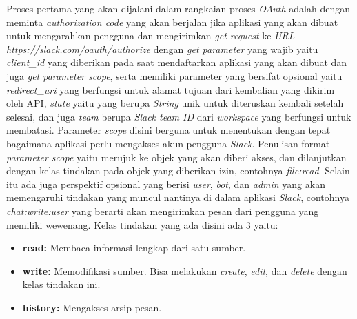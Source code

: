 Proses pertama yang akan dijalani dalam rangkaian proses \textit{OAuth} adalah dengan meminta \textit{authorization code} yang akan berjalan jika aplikasi yang akan dibuat untuk mengarahkan pengguna dan mengirimkan \textit{get request} ke \textit{URL} \textit{https://slack.com/oauth/authorize} dengan \textit{get parameter} yang wajib yaitu \textit{client\_id} yang diberikan pada saat mendaftarkan aplikasi yang akan dibuat dan juga \textit{get parameter scope}, serta memiliki parameter yang bersifat opsional yaitu \textit{redirect\_uri} yang berfungsi untuk alamat tujuan dari kembalian yang dikirim oleh API, \textit{state} yaitu yang berupa \textit{String} unik untuk diteruskan kembali setelah selesai, dan juga \textit{team} berupa \textit{Slack team ID} dari \textit{workspace} yang berfungsi untuk membatasi. Parameter \textit{scope} disini berguna untuk menentukan dengan tepat bagaimana aplikasi perlu mengakses akun pengguna \textit{Slack}. Penulisan format \textit{parameter scope} yaitu merujuk ke objek yang akan diberi akses, dan dilanjutkan dengan kelas tindakan pada objek yang diberikan izin, contohnya \textit{file:read}. Selain itu ada juga perspektif opsional yang berisi \textit{user}, \textit{bot}, dan \textit{admin} yang akan memengaruhi tindakan yang muncul nantinya di dalam aplikasi \textit{Slack}, contohnya \textit{chat:write:user} yang berarti akan mengirimkan pesan dari pengguna yang memiliki wewenang. Kelas tindakan yang ada disini ada 3 yaitu:
\begin{itemize}
	\item \textbf{read:} Membaca informasi lengkap dari satu sumber. 
	\item \textbf{write:} Memodifikasi sumber. Bisa melakukan \textit{create}, \textit{edit}, dan \textit{delete} dengan kelas tindakan ini. 
	\item \textbf{history:} Mengakses arsip pesan. 
\end{itemize} 

